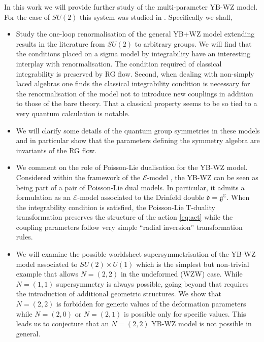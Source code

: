 \documentclass[12pt]{article}
\begin{document}
In this work we will provide further study of the multi-parameter YB-WZ model.  For the case of $SU(2)$ this system was studied in   \cite{Kawaguchi:2011mz,Kawaguchi:2013gma}. Specifically we shall,  

\begin{itemize}
\item Study the one-loop renormalisation of the general YB+WZ model extending results in the literature from $SU(2)$   \cite{Kawaguchi:2011mz} to arbitrary groups.  We will find that the conditions placed on a sigma model by integrability have an interesting interplay with renormalisation.  The condition required of classical integrability is preserved by RG flow.  Second, when dealing with non-simply laced algebras one finds the classical integrability condition is necessary for the renormalisation of the model not to introduce new couplings in addition to those of the bare theory.   That a classical property seems to be so tied to a very quantum calculation is notable.
\item We will clarify some details of the quantum group symmetries in these models and in particular show that the parameters defining the symmetry algebra are invariants of the RG flow. 
\item We comment on the role of  Poisson-Lie dualisation for the YB-WZ model.  Considered within the framework of the $\mathcal E$-model  \cite{Klimcik:2017ken}, the YB-WZ can be seen as being part of a pair of Poisson-Lie dual models. In particular, it admits a formulation as an $\mathcal E$-model associated to the Drinfeld double $\mathfrak d= \mathfrak g^{\mathbb C}$. When the integrability condition is satisfied,  the Poisson-Lie T-duality transformation preserves the structure of the action \eqref{eq:act} while the coupling parameters follow very simple ``radial inversion'' transformation rules. 

\item We will examine the possible worldsheet supersymmetrisation of the YB-WZ model associated to $SU(2)\times U(1)$ which is the simplest but non-trivial example that allows $N=(2,2)$ in the undeformed (WZW) case. While $N=(1,1)$ supersymmetry is always possible, going beyond that requires the introduction of additional geometric structures. We show that $N=(2,2)$ is forbidden for generic values of the deformation parameters while $N=(2,0)$ or $N=(2,1)$ is possible only for specific values. This leads us to conjecture that an $N=(2,2)$ YB-WZ model is not possible in general.
\end{itemize}
\end{document}
